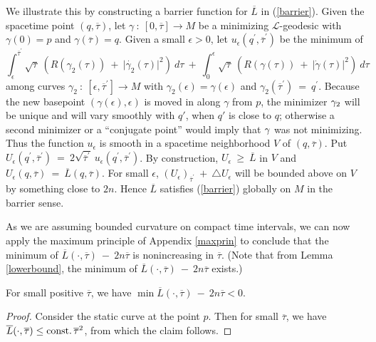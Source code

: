 We illustrate this by constructing a barrier function for
$\overline{L}$ in (\ref{barrier}). Given the spacetime point
$(q, \overline{\tau})$, let $\gamma \: : \: [0, \overline{\tau}]
\rightarrow M$ be a minimizing ${\mathcal L}$-geodesic with
$\gamma(0) = p$ and $\gamma(\overline{\tau}) = q$. Given a small
$\epsilon > 0$, let
$u_\epsilon(q^\prime, \overline{\tau}^\prime)$ be the minimum of
\begin{equation}
\int_{\epsilon}^{\overline{\tau}^\prime} \sqrt{\tau} \: \left(
R(\gamma_2(\tau)) \: + \:
\big| \dot{\gamma_2}(\tau) \big|^2 \right) \: d\tau \: + \:
\int_{0}^{\epsilon} \sqrt{\tau} \: \left(
R(\gamma(\tau)) \: + \:
\big| \dot{\gamma}(\tau) \big|^2 \right) \: d\tau
\end{equation}
among curves $\gamma_2 \: : \: [\epsilon, \overline{\tau}^\prime]
\rightarrow M$
with $\gamma_2(\epsilon) = \gamma(\epsilon)$ and
$\gamma_2(\overline{\tau}^\prime) \: = \: q^\prime$.
Because the
new basepoint $(\gamma(\epsilon), \epsilon)$
is moved in along $\gamma$
from $p$, the minimizer $\gamma_2$  will be unique and will vary smoothly with $q'$, when
$q'$ is close to $q$; otherwise a second minimizer or a ``conjugate
point'' would imply that $\gamma$ was not minimizing. Thus the function $u_\epsilon$
is smooth in a spacetime
neighborhood $V$ of
$(q, \overline{\tau})$. Put
$U_\epsilon(q^\prime, \overline{\tau}^\prime) \: = \:
2 \sqrt{\overline{\tau}^\prime} \:
u_\epsilon(q^\prime, \overline{\tau}^\prime)$.
By construction, $U_\epsilon \: \ge \: \overline{L}$ in $V$ and
$U_\epsilon(q, \overline{\tau}) \: = \: \overline{L}(q, \overline{\tau})$.
For small $\epsilon$,
$(U_\epsilon)_{\overline{\tau}^\prime} \: + \: \triangle U_\epsilon$
will be bounded above
on $V$ by something close to $2n$. Hence
$\overline{L}$ satisfies (\ref{barrier}) globally on $M$ in the barrier sense.

As we are assuming bounded curvature on compact time intervals,
we can now apply the maximum principle of Appendix \ref{maxprin}
to conclude that the minimum of $\overline{L}(\cdot, \overline{\tau})
\: - \: 2n \overline{\tau}$ is nonincreasing in $\overline{\tau}$.
(Note that from Lemma \ref{lowerbound}, the minimum of
$\overline{L}(\cdot, \overline{\tau})
\: - \: 2n \overline{\tau}$ exists.)


\begin{lemma}
  \label{lem:kl-reduced-l-geometry-positivity-reduced-l-geometry}
 \label{neg}
For small positive $\overline{\tau}$, we have
$\min \overline{L}(\cdot, \overline{\tau})
\: - \: 2n \overline{\tau} < 0$.
\end{lemma}
\begin{proof}
Consider the
static curve at the point $p$. Then
for small $\overline{\tau}$, we have
$\overline{L}(\cdot, \overline{\tau}) \le \operatorname{const.} \overline{\tau}^2$,
from which the claim follows.
\end{proof}

